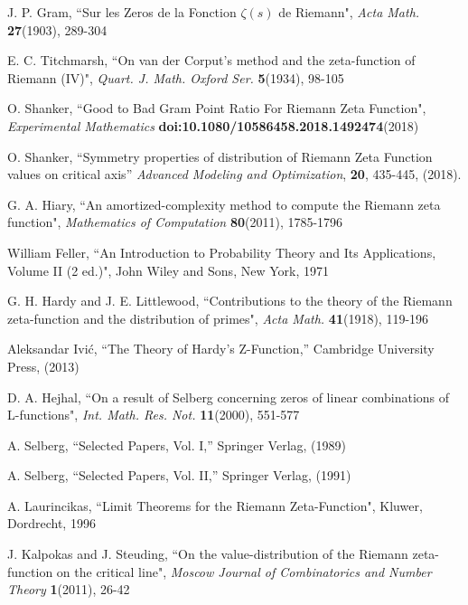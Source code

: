 \documentclass[twoside]{article}
\begin{document}

\begin{thebibliography}{10}

 J. P. Gram, 
``Sur les Zeros de la Fonction  $\zeta ( s )$  de Riemann",
{\it Acta Math.} {\bf27}(1903), 289-304

 E. C. Titchmarsh,
``On van der Corput's method and the zeta-function of Riemann (IV)",
{\it Quart. J. Math. Oxford Ser.} {\bf5}(1934), 98-105

 O. Shanker, 
``Good to Bad Gram Point Ratio For Riemann Zeta Function",
{\it Experimental Mathematics} {\bf doi:10.1080/10586458.2018.1492474}(2018)

 O. Shanker, ``Symmetry properties of distribution of Riemann Zeta Function values on critical axis''
{\it Advanced Modeling and Optimization}, {\bf 20}, 435-445, (2018). 


 G. A. Hiary,
``An amortized-complexity method to compute the Riemann zeta function", 
{\it Mathematics of Computation} {\bf80}(2011), 1785-1796

 William Feller,
``An Introduction to Probability Theory and Its Applications, Volume II (2 ed.)",
John Wiley and Sons, New York, 1971

 G. H. Hardy and J. E. Littlewood,
``Contributions to the theory of the Riemann
zeta-function and the distribution of primes",
{\it Acta Math.} {\bf41}(1918), 119-196

 Aleksandar Ivi\'c, ``The Theory of Hardy's Z-Function,''
Cambridge University Press,  (2013)

 D. A. Hejhal,
``On a result of Selberg concerning zeros of linear combinations
of L-functions", 
{\it Int. Math. Res. Not.} {\bf11}(2000), 551-577

 A. Selberg, ``Selected Papers, Vol. I,''
Springer Verlag,  (1989)

 A. Selberg, ``Selected Papers, Vol. II,''
Springer Verlag,  (1991)



 A. Laurincikas,
``Limit Theorems for the Riemann Zeta-Function",
Kluwer, Dordrecht, 1996

 J. Kalpokas and J. Steuding,
``On the value-distribution of the Riemann zeta-function on the critical line", 
{\it Moscow Journal of Combinatorics and
Number Theory} {\bf1}(2011), 26-42


\end{thebibliography}
\end{document}

